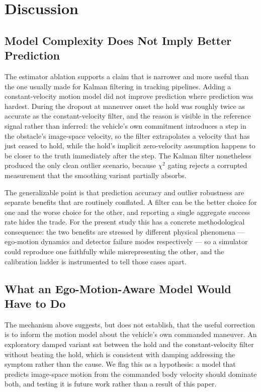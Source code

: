 \section{Discussion}
\label{sec:discussion}


\subsection{Model Complexity Does Not Imply Better Prediction}

The estimator ablation supports a claim that is narrower and more useful than
the one usually made for Kalman filtering in tracking pipelines. Adding a
constant-velocity motion model did not improve prediction where prediction
was hardest. During the dropout at maneuver onset the hold was roughly twice
as accurate as the constant-velocity filter, and the reason is visible in the
reference signal rather than inferred: the vehicle's own commitment
introduces a step in the obstacle's image-space velocity, so the filter
extrapolates a velocity that has just ceased to hold, while the hold's
implicit zero-velocity assumption happens to be closer to the truth
immediately after the step. The Kalman filter nonetheless produced the only
clean outlier scenario, because $\chi^2$ gating rejects a corrupted
measurement that the smoothing variant partially absorbs.

The generalizable point is that prediction accuracy and outlier robustness
are separate benefits that are routinely conflated. A filter can be the
better choice for one and the worse choice for the other, and reporting a
single aggregate success rate hides the trade. For the present study this has
a concrete methodological consequence: the two benefits are stressed by
different physical phenomena --- ego-motion dynamics and detector failure
modes respectively --- so a simulator could reproduce one faithfully while
misrepresenting the other, and the calibration ladder is instrumented to tell
those cases apart.

\subsection{What an Ego-Motion-Aware Model Would Have to Do}

The mechanism above suggests, but does not establish, that the useful
correction is to inform the motion model about the vehicle's own commanded
maneuver. An exploratory damped variant sat between the hold and the
constant-velocity filter without beating the hold, which is consistent with
damping addressing the symptom rather than the cause. We flag this as a
hypothesis: a model that predicts image-space motion from the commanded body
velocity should dominate both, and testing it is future work rather than a
result of this paper.

